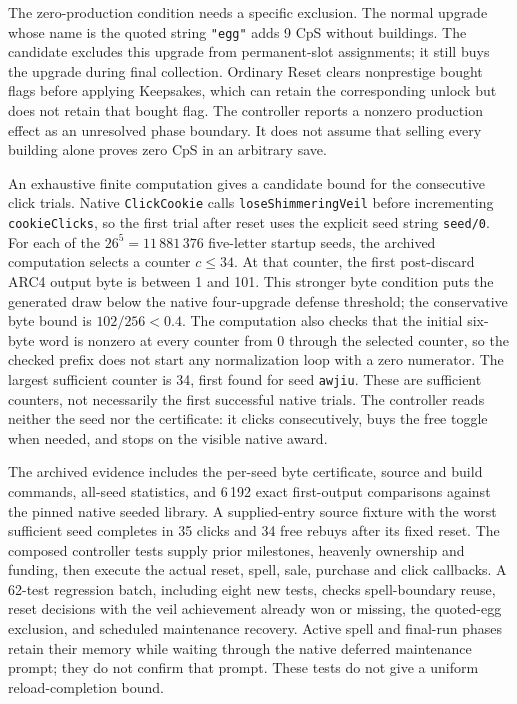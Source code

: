 \documentclass[11pt,a4paper]{article}
\numberwithin{equation}{section}
\theoremstyle{definition}
\theoremstyle{remark}
\begin{document}
The zero-production condition needs a specific exclusion. The normal upgrade whose name is the quoted string \texttt{"egg"} adds 9 CpS without buildings. The candidate excludes this upgrade from permanent-slot assignments; it still buys the upgrade during final collection. Ordinary Reset clears nonprestige bought flags before applying Keepsakes, which can retain the corresponding unlock but does not retain that bought flag. The controller reports a nonzero production effect as an unresolved phase boundary. It does not assume that selling every building alone proves zero CpS in an arbitrary save.

An exhaustive finite computation gives a candidate bound for the consecutive click trials. Native \texttt{ClickCookie} calls \texttt{loseShimmeringVeil} before incrementing \texttt{cookieClicks}, so the first trial after reset uses the explicit seed string \texttt{seed/0}. For each of the $26^5=11\,881\,376$ five-letter startup seeds, the archived computation selects a counter $c\leq34$. At that counter, the first post-discard ARC4 output byte is between 1 and 101. This stronger byte condition puts the generated draw below the native four-upgrade defense threshold; the conservative byte bound is $102/256<0.4$. The computation also checks that the initial six-byte word is nonzero at every counter from 0 through the selected counter, so the checked prefix does not start any normalization loop with a zero numerator. The largest sufficient counter is 34, first found for seed \texttt{awjiu}. These are sufficient counters, not necessarily the first successful native trials. The controller reads neither the seed nor the certificate: it clicks consecutively, buys the free toggle when needed, and stops on the visible native award.

The archived evidence includes the per-seed byte certificate, source and build commands, all-seed statistics, and 6\,192 exact first-output comparisons against the pinned native seeded library. A supplied-entry source fixture with the worst sufficient seed completes in 35 clicks and 34 free rebuys after its fixed reset. The composed controller tests supply prior milestones, heavenly ownership and funding, then execute the actual reset, spell, sale, purchase and click callbacks. A 62-test regression batch, including eight new tests, checks spell-boundary reuse, reset decisions with the veil achievement already won or missing, the quoted-egg exclusion, and scheduled maintenance recovery. Active spell and final-run phases retain their memory while waiting through the native deferred maintenance prompt; they do not confirm that prompt. These tests do not give a uniform reload-completion bound.
\end{document}

